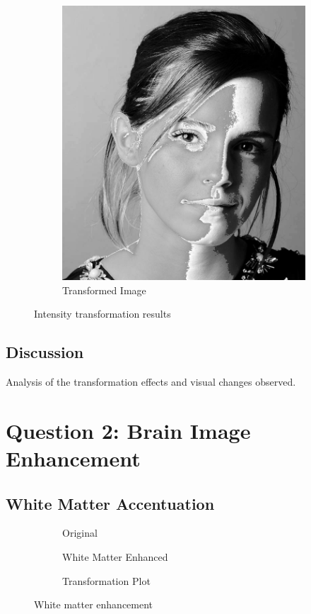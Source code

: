\documentclass[12pt]{article}
\begin{document}
\begin{figure}[H]
\begin{subfigure}{0.45\textwidth}
        \includegraphics[width=\textwidth]{resources/emma_transformed.jpg}
        \caption{Transformed Image}
    \end{subfigure}
    \caption{Intensity transformation results}
\end{figure}

\subsection{Discussion}
Analysis of the transformation effects and visual changes observed.

\section{Question 2: Brain Image Enhancement}
\subsection{White Matter Accentuation}
\begin{figure}[H]
    \centering
    \begin{subfigure}{0.3\textwidth}
        \fbox{\rule{0pt}{1.5in}\rule{1.5in}{0pt}}
        \caption{Original}
    \end{subfigure}
    \hfill
    \begin{subfigure}{0.3\textwidth}
        \fbox{\rule{0pt}{1.5in}\rule{1.5in}{0pt}}
        \caption{White Matter Enhanced}
    \end{subfigure}
    \hfill
    \begin{subfigure}{0.3\textwidth}
        \fbox{\rule{0pt}{1.5in}\rule{1.5in}{0pt}}
        \caption{Transformation Plot}
    \end{subfigure}
    \caption{White matter enhancement}
\end{figure}
\end{document}
